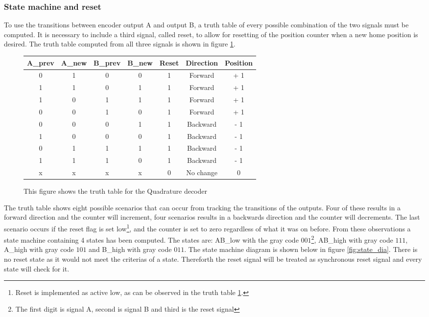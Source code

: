 \documentclass[../../../main]{subfiles}
\begin{document}
\subsubsection{State machine and reset}
\label{subsubsec:reset_state}
To use the transitions between encoder output A and output B, a truth table of every possible combination of the two signals must be computed. It is necessary to include a third signal, called reset, to allow for resetting of the position counter when a new home position is desired. The truth table computed from all three signals is shown in figure \ref{fig:truth_table}.
\begin{figure}[H]
  \begin{tabular}{|c | c | c | c | c | c |c|}
  \hline
   A\_prev & A\_new & B\_prev & B\_new & Reset & Direction & Position \\
   \hline
   0 & 1 & 0 & 0 & 1 & Forward & + 1 \\
   1 & 1 & 0 & 1 & 1 & Forward & + 1 \\
   1 & 0 & 1 & 1 & 1 & Forward & + 1 \\
   0 & 0 & 1 & 0 & 1 & Forward & + 1 \\
   0 & 0 & 0 & 1 & 1 & Backward & - 1 \\
   1 & 0 & 0 & 0 & 1 & Backward & - 1 \\
   0 & 1 & 1 & 1 & 1 & Backward & - 1 \\
   1 & 1 & 1 & 0 & 1 & Backward & - 1 \\
   x & x & x & x & 0 & No change &  0 \\
   \hline
  \end{tabular}
  \caption{This figure shows the truth table for the Quadrature decoder}
  \label{fig:truth_table}
\end{figure}
The truth table shows eight possible scenarios that can occur from tracking the transitions of the outputs. Four of these results in a forward direction and the counter will increment, four scenarios results in a backwards direction and the counter will decrements. The last scenario occurs if the reset flag is set low\footnote{Reset is implemented as active low, as can be observed in the truth table \ref{fig:truth_table}.}, and the counter is set to zero regardless of what it was on before. From these observations a state machine containing 4 states has been computed.  The states are: AB\_low with the gray code $001$\footnote{The first digit is signal A, second is signal B and third is the reset signal}, AB\_high with gray code $111$, A\_high with gray code $101$ and B\_high with gray code $011$. The state machine diagram is shown below in figure \ref{fig:state_dia}.  There is no reset state as it would not meet the criterias of a state. Thereforth the reset signal will be treated as synchronous reset signal and every state will check for it. \\
\end{document}
